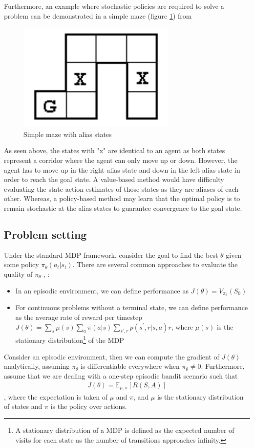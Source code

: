 \documentclass[12pt]{report}
\begin{document}
Furthermore, an example where stochastic policies are required to solve a problem can be demonstrated in a simple maze (figure \ref{fig:alias}) from \cite{shani2005resolving}
\begin{figure}[H]
    \center
    \includegraphics[width=0.3\linewidth]{figs/alias_world.png}
    \caption{Simple maze with alias states}
    \label{fig:alias}
\end{figure}
As seen above, the states with "x" are identical to an agent as both states represent a corridor where the agent can only move up or down. However, the agent has to move up in the right alias state and down in the left alias state in order to reach the goal state. A value-based method would have difficulty evaluating the state-action estimates of those states as they are aliases of each other. Whereas, a policy-based method may learn that the optimal policy is to remain stochastic at the alias states to guarantee convergence to the goal state.

\subsection{Problem setting} \label{sec:policy-grad-bandit}

Under the standard MDP framework, consider the goal to find the best $\theta$ given some policy $\pi_\theta(a_t|s_t)$. There are several common approaches to evaluate the quality of $\pi_\theta$ \cite{sutton2018reinforcement}, \cite{sutton2000policy}:
\begin{itemize}
    \item In an episodic environment, we can define performance as $J(\theta)=V_{\pi_\theta}(S_0)$
    \item For continuous problems without a terminal state, we can define performance as the average rate of reward per timestep $J(\theta)=\sum_s\mu(s)\sum_a\pi(a|s)\sum_{s^\prime,r}p(s^\prime,r|s,a)r$, where $\mu(s)$ is the stationary distribution\footnote{A stationary distribution of a MDP is defined as the expected number of visits for each state as the number of transitions approaches infinity.} of the MDP
\end{itemize}
Consider an episodic environment, then we can compute the gradient of $J(\theta)$ analytically, assuming $\pi_\theta$ is differentiable everywhere when $\pi_\theta \neq 0$. Furthermore, assume that we are dealing with a one-step episodic bandit scenario such that
\begin{align}
    J(\theta)=\mathbb{E}_{\mu, \pi}[R(S,A)]
\end{align}
, where the expectation is taken of $\mu$ and $\pi$, and $\mu$ is the stationary distribution of states and $\pi$ is the policy over actions.\\
\end{document}
